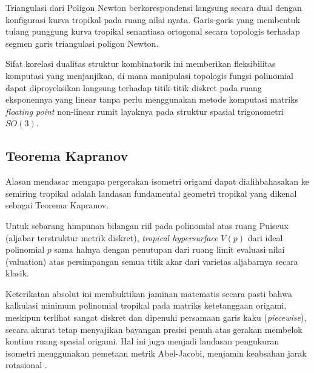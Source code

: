 Triangulasi dari Poligon Newton berkorespondensi langsung secara dual dengan konfigurasi kurva tropikal pada ruang nilai nyata. Garis-garis yang membentuk tulang punggung kurva tropikal senantiasa ortogonal secara topologis terhadap segmen garis triangulasi poligon Newton.

Sifat korelasi dualitas struktur kombinatorik ini memberikan fleksibilitas komputasi yang menjanjikan, di mana manipulasi topologis fungsi polinomial dapat diproyeksikan langsung terhadap titik-titik diskret pada ruang eksponennya yang linear tanpa perlu menggunakan metode komputasi matriks \textit{floating point} non-linear rumit layaknya pada struktur spasial trigonometri $SO(3)$.

\subsection{Teorema Kapranov}
Alasan mendasar mengapa pergerakan isometri origami dapat dialihbahasakan ke semiring tropikal adalah landasan fundamental geometri tropikal yang dikenal sebagai Teorema Kapranov.
\begin{teorema}
  Untuk sebarang himpunan bilangan riil pada polinomial atas ruang Puiseux (aljabar terstruktur metrik diskret), \textit{tropical hypersurface} $V(p)$ dari ideal polinomial $p$ sama halnya dengan penutupan dari ruang limit evaluasi nilai (valuation) atas persimpangan semua titik akar dari varietas aljabarnya secara klasik.
\end{teorema}

Keterikatan absolut ini membuktikan jaminan matematis secara pasti bahwa kalkulasi minimum polinomial tropikal pada matriks ketetanggaan origami, meskipun terlihat sangat diskret dan dipenuhi persamaan garis kaku (\textit{piecewise}), secara akurat tetap menyajikan bayangan presisi penuh atas gerakan membelok kontinu ruang spasial origami. Hal ini juga menjadi landasan pengukuran isometri menggunakan pemetaan metrik Abel-Jacobi, menjamin keabsahan jarak rotasional \parencite{foster2020metric}.